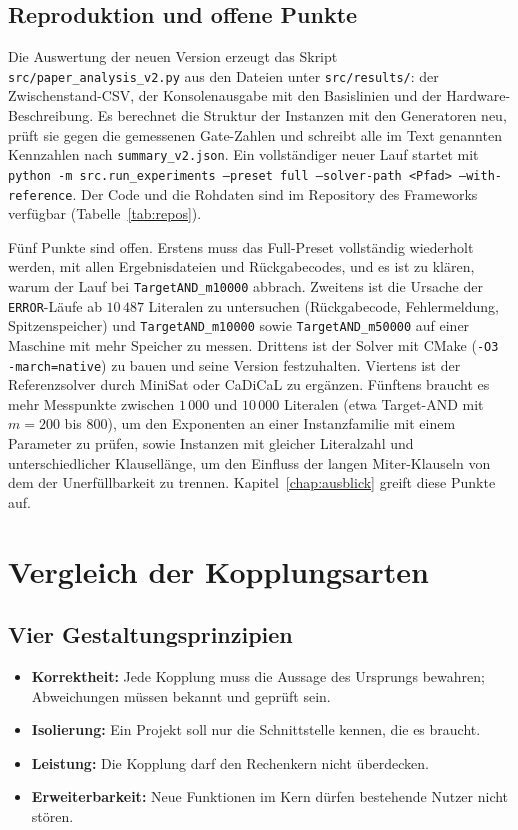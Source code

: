 \section{Reproduktion und offene Punkte}
\label{sec:exp_repro}

Die Auswertung der neuen Version erzeugt das Skript \texttt{src/paper\_analysis\_v2.py} aus den Dateien unter \texttt{src/results/}: der Zwischenstand-CSV, der Konsolenausgabe mit den Basislinien und der Hardware-Beschreibung. Es berechnet die Struktur der Instanzen mit den Generatoren neu, prüft sie gegen die gemessenen Gate-Zahlen und schreibt alle im Text genannten Kennzahlen nach \texttt{summary\_v2.json}. Ein vollständiger neuer Lauf startet mit \texttt{python -m src.run\_experiments --preset full --solver-path <Pfad> --with-reference}. Der Code und die Rohdaten sind im Repository des Frameworks verfügbar (Tabelle~\ref{tab:repos}).

Fünf Punkte sind offen. Erstens muss das Full-Preset vollständig wiederholt werden, mit allen Ergebnisdateien und Rückgabecodes, und es ist zu klären, warum der Lauf bei \texttt{TargetAND\_m10000} abbrach. Zweitens ist die Ursache der \texttt{ERROR}-Läufe ab $10\,487$ Literalen zu untersuchen (Rückgabecode, Fehlermeldung, Spitzenspeicher) und \texttt{TargetAND\_m10000} sowie \texttt{TargetAND\_m50000} auf einer Maschine mit mehr Speicher zu messen. Drittens ist der Solver mit CMake (\texttt{-O3 -march=native}) zu bauen und seine Version festzuhalten. Viertens ist der Referenzsolver durch MiniSat oder CaDiCaL zu ergänzen. Fünftens braucht es mehr Messpunkte zwischen $1\,000$ und $10\,000$ Literalen (etwa Target-AND mit $m=200$ bis $800$), um den Exponenten an einer Instanzfamilie mit einem Parameter zu prüfen, sowie Instanzen mit gleicher Literalzahl und unterschiedlicher Klausellänge, um den Einfluss der langen Miter-Klauseln von dem der Unerfüllbarkeit zu trennen. Kapitel~\ref{chap:ausblick} greift diese Punkte auf.

\chapter{Vergleich der Kopplungsarten}
\label{chap:vergleich}

\section{Vier Gestaltungsprinzipien}

\begin{itemize}
	\item \textbf{Korrektheit:} Jede Kopplung muss die Aussage des Ursprungs bewahren; Abweichungen müssen bekannt und geprüft sein.
	\item \textbf{Isolierung:} Ein Projekt soll nur die Schnittstelle kennen, die es braucht.
	\item \textbf{Leistung:} Die Kopplung darf den Rechenkern nicht überdecken.
	\item \textbf{Erweiterbarkeit:} Neue Funktionen im Kern dürfen bestehende Nutzer nicht stören.
\end{itemize}

